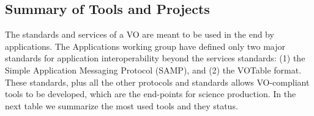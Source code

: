 \subsection{Summary of Tools and Projects}

The standards and services of a VO are meant to be used in the end 
by applications. The Applications working group have defined only two major
standards for application interoperability beyond the services standards: 
(1) the Simple Application Messaging Protocol (SAMP), and (2) the VOTable
format. These standards, plus all the other protocols and standards 
allows VO-compliant tools to be developed, which are the end-points for
science production. In the next table we summarize the most used tools
and they status.

